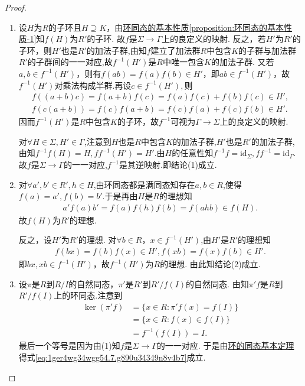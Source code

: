 \documentclass[../../main.tex]{subfiles}%
\begin{document}
\begin{proof}
\begin{enumerate}[(1)]
\item 设$H$为$R$的子环且$H \supseteq K$，由\hyperref[proposition:环同态的基本性质]{环同态的基本性质\ref{proposition:环同态的基本性质-1}}知$f(H)$为$R'$的子环. 故$f$是$\Sigma\to \Gamma$上的良定义的映射.
反之，若$H'$为$R'$的子环，则$H'$也是$R'$的加法子群,由知$f$建立了加法群$R$中包含$K$的子群与加法群$R'$的子群间的一一对应,故$f^{-1}(H')$是$R$中唯一包含$K$的加法子群. 又若$a,b \in f^{-1}(H')$，则有$f(ab) = f(a)f(b) \in H'$，即$ab \in f^{-1}(H')$，故$f^{-1}(H')$对乘法构成半群.再设$c\in f^{-1}(H'),$则
\begin{align*}
f((a+b)c)=f(a+b)f(c)=f(a)f(c)+f(b)f(c)\in H',
\\
f(c(a+b))=f(c)f(a+b)=f(c)f(a)+f(c)f(b)\in H'.
\end{align*}
因而$f^{-1}(H')$是$R$中包含$K$的子环，故$f^{-1}$可视为$\Gamma\to \Sigma$上的良定义的映射.

对$\forall H\in \Sigma,H'\in \Gamma$,注意到$H$也是$R$中包含$K$的加法子群,$H'$也是$R'$的加法子群,由知$f^{-1}f(H)=H,ff^{-1}(H')=H'.$由$H$的任意性知$f^{-1}f=\mathrm{id}_{\Sigma},ff^{-1}=\mathrm{id}_{\Gamma}.$故$f$是$\Sigma\to \Gamma$的一一对应,$f^{-1}$是其逆映射.即结论(1)成立.

\item 对$\forall a',b' \in R',h \in H$,由环同态都是满同态知存在$a,b\in R$,使得$f(a)=a',f(b)=b'$.于是再由$H$是$R$的理想知
\begin{align*}
a'f(a)b'=f(a)f(h)f(b) = f(ahb) \in f(H).
\end{align*}
故$f(H)$为$R'$的理想. 

反之，设$H'$为$R'$的理想. 对$\forall b \in R$，$x \in f^{-1}(H')$,由$H'$是$R'$的理想知
\begin{align*}
f(bx) = f(b)f(x) \in H',f(xb) = f(x)f(b) \in H'.
\end{align*}
即$bx, xb \in f^{-1}(H')$，故$f^{-1}(H')$为$R$的理想. 由此知结论(2)成立.

\item 设$\pi$是$R$到$R/I$的自然同态，$\pi'$是$R'$到$R'/f(I)$的自然同态. 由知$\pi'f$是$R$到$R'/f(I)$上的环同态.注意到
\begin{align*}
\ker(\pi' f) &= \{ x \in R : \pi' f(x) = f(I) \} \\
&= \{ x \in R : f(x) \in f(I) \} \\
&= f^{-1}(f(I)) = I.
\end{align*}
最后一个等号是因为由(1)知$f$是$\Sigma \rightarrow \Gamma$的一一对应.
于是由\hyperref[theorem:环的同态基本定理]{环的同态基本定理}得式\eqref{eq:1ger4wg34wgg54.7.g890u34349n8v4b7}成立.
\end{enumerate}
\end{proof}
\end{document}
